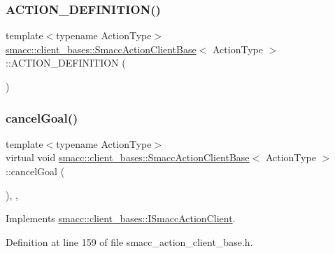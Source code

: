 \subsubsection{\texorpdfstring{A\+C\+T\+I\+O\+N\+\_\+\+D\+E\+F\+I\+N\+I\+T\+I\+O\+N()}{ACTION\_DEFINITION()}}
{\footnotesize\ttfamily template$<$typename Action\+Type$>$ \\
\hyperlink{classsmacc_1_1client__bases_1_1SmaccActionClientBase}{smacc\+::client\+\_\+bases\+::\+Smacc\+Action\+Client\+Base}$<$ Action\+Type $>$\+::A\+C\+T\+I\+O\+N\+\_\+\+D\+E\+F\+I\+N\+I\+T\+I\+ON (\begin{DoxyParamCaption}\item[{Action\+Type}]{ }\end{DoxyParamCaption})}

\mbox{\label{classsmacc_1_1client__bases_1_1SmaccActionClientBase_aedeaf9704b73bf05b5522f7250416c9a}} 
\subsubsection{\texorpdfstring{cancel\+Goal()}{cancelGoal()}}
{\footnotesize\ttfamily template$<$typename Action\+Type$>$ \\
virtual void \hyperlink{classsmacc_1_1client__bases_1_1SmaccActionClientBase}{smacc\+::client\+\_\+bases\+::\+Smacc\+Action\+Client\+Base}$<$ Action\+Type $>$\+::cancel\+Goal (\begin{DoxyParamCaption}{ }\end{DoxyParamCaption})\hspace{0.3cm}{\ttfamily [inline]}, {\ttfamily [override]}, {\ttfamily [virtual]}}



Implements \hyperlink{classsmacc_1_1client__bases_1_1ISmaccActionClient_ac4880d5bb0e8a343d323a6c46984476d}{smacc\+::client\+\_\+bases\+::\+I\+Smacc\+Action\+Client}.



Definition at line 159 of file smacc\+\_\+action\+\_\+client\+\_\+base.\+h.


